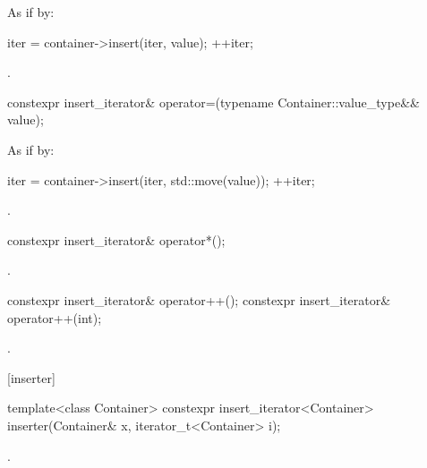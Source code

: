 \begin{itemdescr}
\pnum
\effects
As if by:
\begin{codeblock}
iter = container->insert(iter, value);
++iter;
\end{codeblock}

\pnum
\returns
{}.
\end{itemdescr}

%
\begin{itemdecl}
constexpr insert_iterator& operator=(typename Container::value_type&& value);
\end{itemdecl}

\begin{itemdescr}
\pnum
\effects
As if by:
\begin{codeblock}
iter = container->insert(iter, std::move(value));
++iter;
\end{codeblock}

\pnum
\returns
{}.
\end{itemdescr}

%
\begin{itemdecl}
constexpr insert_iterator& operator*();
\end{itemdecl}

\begin{itemdescr}
\pnum
\returns
{}.
\end{itemdescr}

%
\begin{itemdecl}
constexpr insert_iterator& operator++();
constexpr insert_iterator& operator++(int);
\end{itemdecl}

\begin{itemdescr}
\pnum
\returns
{}.
\end{itemdescr}

[inserter]{}

%
\begin{itemdecl}
template<class Container>
  constexpr insert_iterator<Container>
    inserter(Container& x, iterator_t<Container> i);
\end{itemdecl}

\begin{itemdescr}
\pnum
\returns
{}.
\end{itemdescr}

